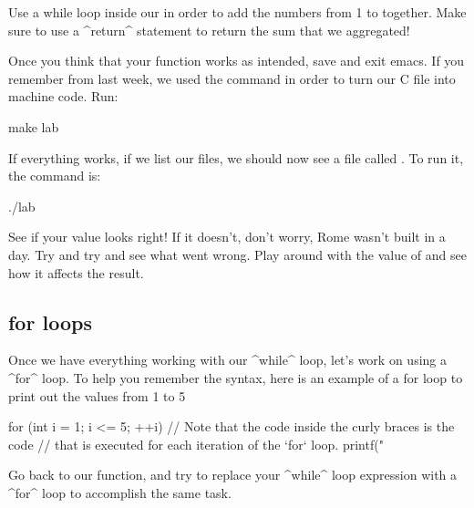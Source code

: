 \documentclass{tufte-handout}
\begin{document}
Use a while loop inside our  in order to
add the numbers from 1 to  together. Make sure to
use a ^return^ statement to return the sum that we aggregated!

Once you think that your function works as intended, save and exit
emacs. If you remember from last week, we used the 
command in order to turn our C file into machine code. Run:

\begin{CmdLine*}
  \C make lab\\
\end{CmdLine*}

If everything works, if we list our files, we should now see a file
called . To run it, the command is:

\begin{CmdLine*}
  \C ./lab\\
\end{CmdLine*}

See if your value looks right!  If it doesn't, don't worry, Rome wasn't
built in a day.  Try and try and see what went wrong.  Play around with the value of  and see
how it affects the result.

\subsection{{\codestyleKeyword for} loops}

Once we have everything working with our ^while^ loop, let's work on
using a ^for^ loop.  To help you remember the syntax, here is an example of a for loop to print out the values from 1 to 5

\begin{Code}
    for (int i = 1; i <= 5; ++i) {
        // Note that the code inside the curly braces is the code
        // that is executed for each iteration of the `for` loop.
        printf("%
    }
\end{Code}

Go back to our  function, and try to replace
your ^while^ loop expression with a ^for^ loop to accomplish the same task.
\end{document}
